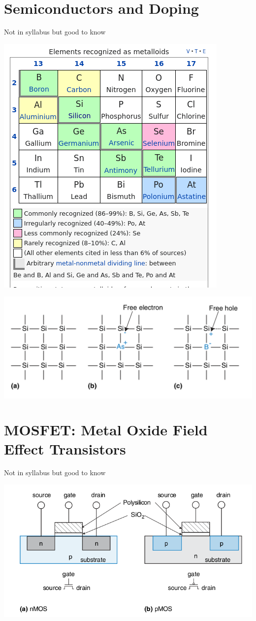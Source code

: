 \documentclass{article}
\begin{document}
\section{Semiconductors and Doping}
{\tiny{Not in syllabus but good to know}}

\includegraphics[width=0.5\linewidth]{fig/semiconductors-periodic-table.png}


\includegraphics[width=0.8\linewidth]{fig/fig1.26-Si-doping.png}

\section{MOSFET: Metal Oxide Field Effect Transistors }
{\tiny{Not in syllabus but good to know}}

\includegraphics[width=0.8\linewidth]{fig/fig1.29-nMOS-pMOS-transistors.png}
\end{document}
